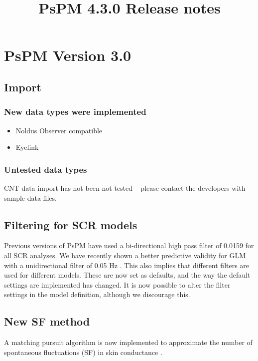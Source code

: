\documentclass[english]{article}
\title{PsPM 4.3.0 Release notes}
\numberwithin{equation}{section}
\numberwithin{figure}{section}
\begin{document}
\maketitle
\date
\pagebreak

\section{PsPM Version 3.0}

\subsection*{Import}

\subsubsection*{New data types were implemented}
\begin{itemize}
\item Noldus Observer compatible 
\item Eyelink
\end{itemize}

\subsubsection*{Untested data types}

CNT data import has not been not tested -- please contact the developers
with sample data files. 

\subsection*{Filtering for SCR models}

Previous versions of PsPM have used a bi-directional high pass filter
of 0.0159 for all SCR analyses. We have recently shown a better predictive
validity for GLM with a unidirectional filter of 0.05 Hz \cite{Bach:2013aa}.
This also implies that different filters are used for different models.
These are now set as defaults, and the way the default settings are
implemented has changed. It is now possible to alter the filter settings
in the model definition, although we discourage this.

\subsection*{New SF method}

A matching pursuit algorithm is now implemented to approximate the
number of spontaneous fluctuations (SF) in skin conductance \cite{Bach:2015aa}.
\end{document}
